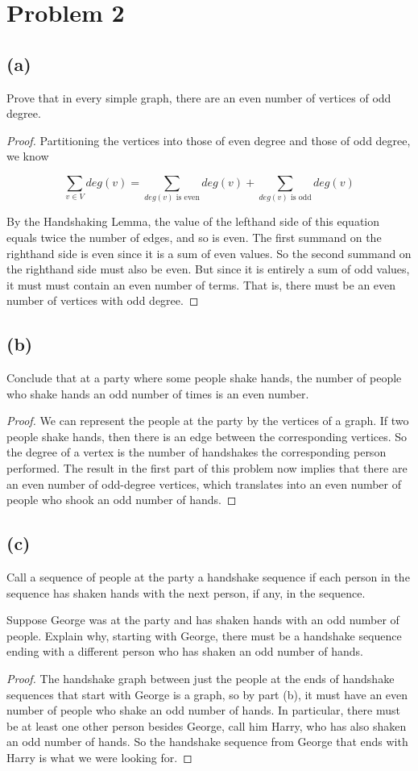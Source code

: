 \documentclass[14pt]{extarticle}
\begin{document}
\section{Problem 2}
\subsection{(a)}
Prove that in every simple graph, there are an even number of vertices of odd degree.
\begin{proof}
Partitioning the vertices into those of even degree and those of odd degree, we know

$$
\sum_{v \in V} deg(v) = \sum_{deg(v) \text{ is even}} deg(v) +\sum_{deg(v) \text{ is odd}} deg(v)
$$

By the Handshaking Lemma, the value of the lefthand side of this equation equals twice the num­ber of edges, and so is even. The first summand on the righthand side is even since it is a sum of even values. So the second summand on the righthand side must also be even. But since it is entirely a sum of odd values, it must must contain an even number of terms. That is, there must be an even number of vertices with odd degree.
\end{proof}

\subsection{(b)}
Conclude that at a party where some people shake hands, the number of people who shake hands an odd number of times is an even number.
\begin{proof}
We can represent the people at the party by the vertices of a graph. If two people shake hands, then there is an edge between the corresponding vertices. So the degree of a vertex is the number of handshakes the corresponding person performed. The result in the first part of this problem now implies that there are an even number of odd-degree vertices, which translates into an even number of people who shook an odd number of hands.
\end{proof}

\subsection{(c)}
Call a sequence of people at the party a handshake sequence if each person in the sequence has shaken hands with the next person, if any, in the sequence.

Suppose George was at the party and has shaken hands with an odd number of people. Explain why, starting with George, there must be a handshake sequence ending with a different person who has shaken an odd number of hands.
\begin{proof}
The handshake graph between just the people at the ends of handshake sequences that start with George is a graph, so by part (b), it must have an even number of people who shake an odd number of hands. In particular, there must be at least one other person besides George, call him Harry, who has also shaken an odd number of hands. So the handshake sequence from George that ends with Harry is what we were looking for.
\end{proof}
\end{document}
